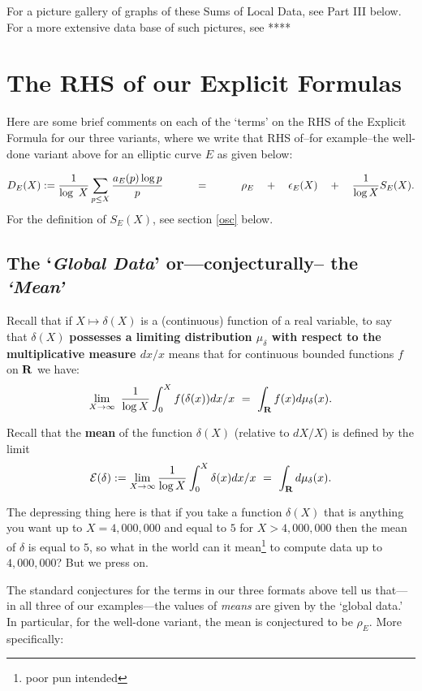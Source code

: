 \documentclass[11pt]{article}
\theoremstyle{plain}
\theoremstyle{definition}
\numberwithin{equation}{section}
\numberwithin{figure}{section}
\numberwithin{table}{section}
\begin{document}
   For a picture gallery of graphs of these Sums of Local Data, see Part III below. For a more extensive data base of such pictures, see ****

  \section{ The RHS of our Explicit Formulas}
   Here are some brief comments on each of the `terms' on the RHS of the Explicit  Formula for our three variants, where we write that RHS of--for example--the well-done variant above for an elliptic curve $E$  as given below:

   $${D}_E(X):= {\frac{1}{\log\ X}}\sum_{p \le X}{\frac{a_E(p)\log p}{ p}}\hskip30pt = \hskip30pt \rho_E\ \ \  + \  \ \ \epsilon_{E}(X)\ \ \  + \ \ \ {\frac{1}{\log X}}S_E(X).$$ For the definition of $S_E(X)$, see section \ref{osc} below.
 \subsection {The `{\it Global Data}' or---conjecturally-- the {\it `Mean'}}\label{mean}
   Recall that if   $X \mapsto \delta(X)$ is a (continuous) function of a real variable,  to say that $\delta(X)$ {\bf possesses a limiting distribution $\mu_\delta$ with respect to the multiplicative measure $dx/x$} means that  for continuous bounded functions $f$ on ${\bf R}$ we have:
\begin{equation*}
\lim_{X \to {\infty}}\ {\frac{1}{\log X}}\int_0^Xf(\delta(x))dx/x \ = \ \int_{\bf R}f(x)d\mu_\delta(x).
\end{equation*}

\bigskip

    Recall that the {\bf mean} of the function $\delta(X)$ (relative to $dX/X$) is defined by the limit  $${\mathcal E}(\delta):= \lim_{X \to {\infty}}{\frac{1}{\log X}}\int_0^X\delta(x)dx/x \ = \ \int_{\bf R}d\mu_\delta(x).$$

     The depressing thing here is that if you take a function $\delta(X)$ that is anything you want up to $X = 4,000,000$ and equal to $5$ for $X>  4,000,000$ then the mean of $\delta$ is equal to $5$, so what in  the world can it mean{\footnote{ poor pun intended}} to compute data up to $4,000,000$? But we press on.

   The standard conjectures for the terms in our three formats above tell us that---in all three of our examples---the values of {\it means} are given by the `global data.' In particular, for the well-done  variant, the mean is conjectured to be $\rho_E$.  More specifically:
\end{document}
